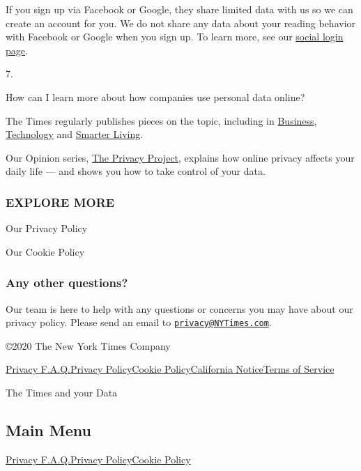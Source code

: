 If you sign up via Facebook or Google, they share limited data with us
so we can create an account for you. We do not share any data about your
reading behavior with Facebook or Google when you sign up. To learn
more, see our
\href{https://help.nytimes3xbfgragh.onion/hc/en-us/articles/115014887628-Social-login}{social
login page}.

7.

How can I learn more about how companies use personal data online?

The Times regularly publishes pieces on the topic, including in
\href{https://www.nytimes3xbfgragh.onion/2019/11/04/business/secret-consumer-score-access.html}{Business},
\href{https://www.nytimes3xbfgragh.onion/2019/11/19/technology/artificial-intelligence-dawn-song.html}{Technology}
and
\href{https://www.nytimes3xbfgragh.onion/2019/11/24/smarter-living/privacy-online-how-to-stop-advertiser-tracking-opt-out.html}{Smarter
Living}.

Our Opinion series,
\href{https://www.nytimes3xbfgragh.onion/series/new-york-times-privacy-project}{The
Privacy Project}, explains how online privacy affects your daily life
--- and shows you how to take control of your data.

\hypertarget{explore-more}{%
\subsubsection{EXPLORE MORE}\label{explore-more}}

\href{/privacy/privacy-policy}{}

Our Privacy Policy

\href{/privacy/cookie-policy}{}

Our Cookie Policy

\hypertarget{any-other-questions}{%
\subsubsection{Any other questions?}\label{any-other-questions}}

Our team is here to help with any questions or concerns you may have
about our privacy policy. Please send an email to
\href{mailto:privacy@NYTimes.com}{\nolinkurl{privacy@NYTimes.com}}.

©2020 The New York Times Company

\href{/privacy}{Privacy F.A.Q.}\href{/privacy/privacy-policy}{Privacy
Policy}\href{/privacy/cookie-policy}{Cookie
Policy}\href{/privacy/california-notice}{California
Notice}\href{https://help.nytimes3xbfgragh.onion/hc/en-us/articles/115014893428-Terms-of-service}{Terms
of Service}

The Times and your Data

\hypertarget{main-menu}{%
\subsection{Main Menu}\label{main-menu}}

\href{/privacy}{Privacy F.A.Q.}\href{/privacy/privacy-policy}{Privacy
Policy}\href{/privacy/cookie-policy}{Cookie Policy}
